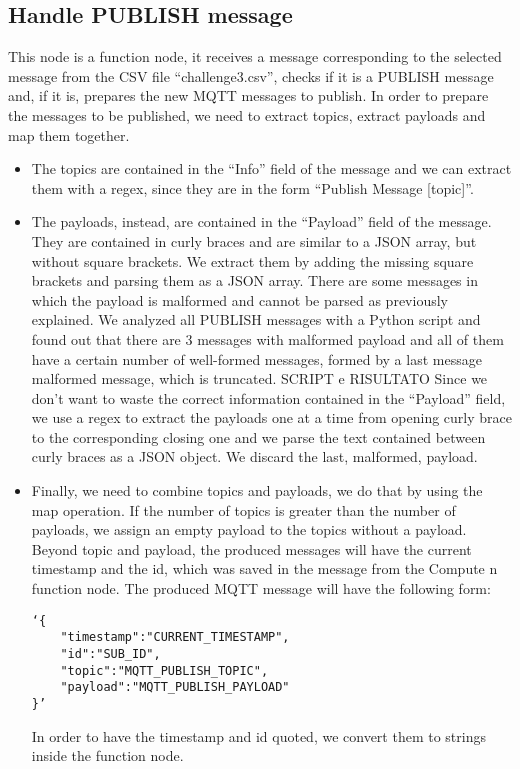 \subsection{Handle PUBLISH message}
This node is a function node, it receives a message corresponding to the selected message from the CSV file “challenge3.csv”, checks if it is a PUBLISH message and, if it is, prepares the new MQTT messages to publish. In order to prepare the messages to be published, we need to extract topics, extract payloads and map them together. 
\begin{itemize}
\item The topics are contained in the “Info” field of the message and we can extract them with a regex, since they are in the form “Publish Message [topic]”. 
\item The payloads, instead, are contained in the “Payload” field of the message. They are contained in curly braces and are similar to a JSON array, but without square brackets. 
We extract them by adding the missing square brackets and parsing them as a JSON array.  
There are some messages in which the payload is malformed and cannot be parsed as previously explained. We analyzed all PUBLISH messages with a Python script and found out that there are 3 messages with malformed payload and all of them have a certain number of well-formed messages, formed by a last message malformed message, which is truncated.
SCRIPT e RISULTATO 
Since we don’t want to waste the correct information contained in the “Payload” field, we use a regex to extract the payloads one at a time from opening curly brace to the corresponding closing one and we parse the text contained between curly braces as a JSON object. We discard the last, malformed, payload.
\item Finally, we need to combine topics and payloads, we do that by using the map operation. If the number of topics is greater than the number of payloads, we assign an empty payload to the topics without a payload. Beyond topic and payload, the produced messages will have the current timestamp and the id, which was saved in the message from the Compute n function node.
The produced MQTT message will have the following form:
\begin{verbatim}
‘{
    "timestamp":"CURRENT_TIMESTAMP",
    "id":"SUB_ID",
    "topic":"MQTT_PUBLISH_TOPIC",
    "payload":"MQTT_PUBLISH_PAYLOAD"
}’
\end{verbatim}
In order to have the timestamp and id quoted, we convert them to strings inside the function node. 
\end{itemize}

